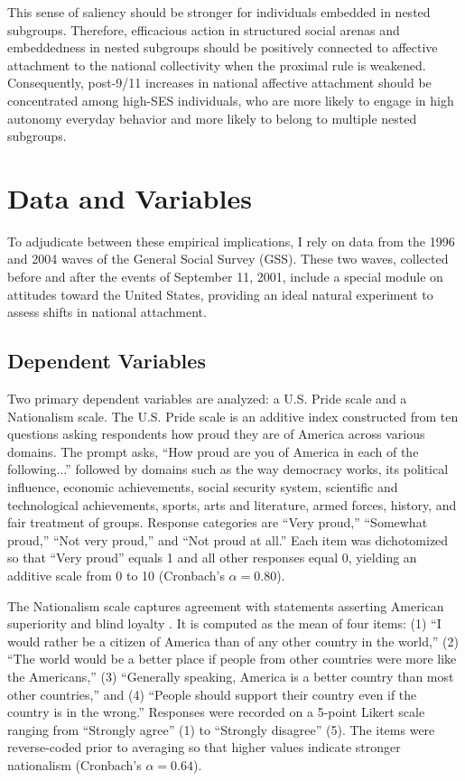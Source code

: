 \documentclass[12pt,letterpaper]{article}
\begin{document}
This sense of saliency should be stronger for individuals embedded in nested subgroups. Therefore, efficacious action in structured social arenas and embeddedness in nested subgroups should be positively connected to affective attachment to the national collectivity when the proximal rule is weakened. Consequently, post-9/11 increases in national affective attachment should be concentrated among high-SES individuals, who are more likely to engage in high autonomy everyday behavior and more likely to belong to multiple nested subgroups.

\section{Data and Variables}

To adjudicate between these empirical implications, I rely on data from the 1996 and 2004 waves of the General Social Survey (GSS). These two waves, collected before and after the events of September 11, 2001, include a special module on attitudes toward the United States, providing an ideal natural experiment to assess shifts in national attachment. 

\subsection{Dependent Variables}
Two primary dependent variables are analyzed: a U.S. Pride scale and a Nationalism scale. The U.S. Pride scale is an additive index constructed from ten questions asking respondents how proud they are of America across various domains. The prompt asks, ``How proud are you of America in each of the following...'' followed by domains such as the way democracy works, its political influence, economic achievements, social security system, scientific and technological achievements, sports, arts and literature, armed forces, history, and fair treatment of groups. Response categories are ``Very proud,'' ``Somewhat proud,'' ``Not very proud,'' and ``Not proud at all.'' Each item was dichotomized so that ``Very proud'' equals 1 and all other responses equal 0, yielding an additive scale from 0 to 10 (Cronbach's $\alpha = 0.80$).

The Nationalism scale captures agreement with statements asserting American superiority and blind loyalty \citep{schatz1999varieties}. It is computed as the mean of four items: (1) ``I would rather be a citizen of America than of any other country in the world,'' (2) ``The world would be a better place if people from other countries were more like the Americans,'' (3) ``Generally speaking, America is a better country than most other countries,'' and (4) ``People should support their country even if the country is in the wrong.'' Responses were recorded on a 5-point Likert scale ranging from ``Strongly agree'' (1) to ``Strongly disagree'' (5). The items were reverse-coded prior to averaging so that higher values indicate stronger nationalism (Cronbach's $\alpha = 0.64$).
\end{document}
